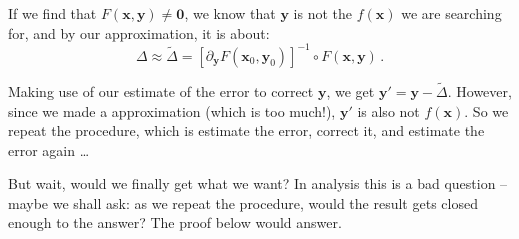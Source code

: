 \documentclass[openany]{book}
\theoremstyle{plain}
\theoremstyle{definition}
\newcommand*{\bv}{\boldsymbol} %
\begin{document}
If we find that $F(\bv x, \bv y) \neq \bv 0$, we know that $\bv y$ is not the $f(\bv x)$ we are searching for, and by our approximation, it is about:
\begin{equation*}
	\Delta \approx \tilde{\Delta} = [\partial_{\bv y} F(\bv x_0, \bv y_0)]^{-1} \circ F(\bv x, \bv y)\,.
\end{equation*}

Making use of our estimate of the error to correct $\bv y$, we get $\bv y' = \bv y - \tilde \Delta$. 
However, since we made a approximation (which is too much!), $\bv y'$ is also not $f(\bv x)$. So we repeat the procedure, which is estimate the error, correct it, and estimate the error again \ldots

But wait, would we finally get what we want? 
In analysis this is a bad question -- maybe we shall ask: as we repeat the procedure, would the result gets closed enough to the answer? 
The proof below would answer.
\end{document}
